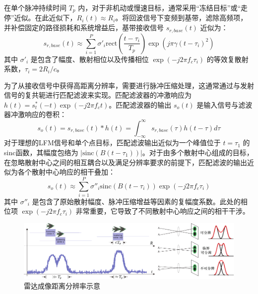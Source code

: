 在单个脉冲持续时间 $T_p$ 内，对于非机动或慢速目标，通常采用“冻结目标”或“走停”近似。在此近似下，$R_i(t) \approx R_i$。将回波信号下变频到基带，滤除高频项，并补偿固定的路径损耗和系统增益后，基带接收信号 $s_{r,base}(t)$ 近似为：
\begin{equation}
    s_{r,base}(t) \approx \sum_{i=1}^{P} \sigma'_i \text{rect}\left(\frac{t-\tau_i}{T_p}\right) \exp\left(j \pi \gamma (t-\tau_i)^2\right)
    \label{eq:received_baseband}
\end{equation}
其中 $\sigma'_i$ 是包含了幅度、散射相位以及传播相位 $\exp(-j 2\pi f_c \tau_i)$ 的等效复散射系数，$\tau_i = 2R_i/c$。

为了从接收信号中获得高距离分辨率，需要进行脉冲压缩处理，这通常通过与发射信号的复共轭进行匹配滤波来实现。匹配滤波器的冲激响应为 $h(t) = s_t^*(-t) \exp(-j 2\pi f_c t)$。匹配滤波器的输出 $s_o(t)$ 是输入信号与滤波器冲激响应的卷积：
\begin{equation}
    s_o(t) = s_{r,base}(t) * h(t) = \int_{-\infty}^{\infty} s_{r,base}(\tau) h(t-\tau) d\tau
    \label{eq:matched_filtering}
\end{equation}
对于理想的LFM信号和单个点目标，匹配滤波输出近似为一个峰值位于 $t = \tau_1$ 的sinc函数，其幅度包络为 $|\text{sinc}(B(t - \tau_1))|$。对于由多个散射中心组成的目标，在忽略散射中心之间的相互耦合以及满足分辨率要求的前提下，匹配滤波的输出近似为各个散射中心响应的相干叠加：
\begin{equation}
    s_o(t) \approx \sum_{i=1}^{P} \sigma''_i \text{sinc}\left(B(t - \tau_i)\right) \exp(-j 2\pi f_c \tau_i)
    \label{eq:pulse_compression_output_phase}
\end{equation}
其中 $\sigma''_i$ 是包含了原始散射幅度、脉冲压缩增益等因素的复幅度系数。此处的相位项 $\exp(-j 2\pi f_c \tau_i)$ 非常重要，它导致了不同散射中心响应之间的相干干涉。

\begin{figure}[h]
    \centering
    \includegraphics[width=\linewidth]{figures/highres.pdf}
    \caption{雷达成像距离分辨率示意}
    \label{fig:highres}
\end{figure}

